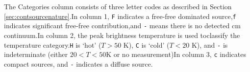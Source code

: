 \begin{table*}[htp]
\par
The Categories column consists of three letter codes as described in Section \ref{sec:contsourcenature}.In column 1, \texttt{F} indicates a free-free dominated source,\texttt{f} indicates significant free-free contribution,and \texttt{-} means there is no detected cm continuum.In column 2, the peak brightness temperature is used toclassify the temperature category.\texttt{H} is `hot' ($T>50$ K), \texttt{C} is `cold' ($T<20$ K), and \texttt{-} is indeterminate (either $20<T<50$K or no measurement)In column 3, \texttt{c} indicates compact sources, and \texttt{-} indicates a diffuse source.
\end{table*}
